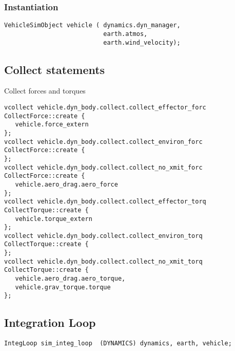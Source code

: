 \documentclass[twoside,11pt,titlepage]{report}
\begin{document}
\subsubsection{Instantiation}
\begin{verbatim}
VehicleSimObject vehicle ( dynamics.dyn_manager,
                           earth.atmos,
                           earth.wind_velocity);
\end{verbatim}

\subsection{Collect statements}
Collect forces and torques
\begin{verbatim}
vcollect vehicle.dyn_body.collect.collect_effector_forc CollectForce::create {
   vehicle.force_extern
};
vcollect vehicle.dyn_body.collect.collect_environ_forc CollectForce::create {
};
vcollect vehicle.dyn_body.collect.collect_no_xmit_forc CollectForce::create {
   vehicle.aero_drag.aero_force
};
vcollect vehicle.dyn_body.collect.collect_effector_torq CollectTorque::create {
   vehicle.torque_extern
};
vcollect vehicle.dyn_body.collect.collect_environ_torq CollectTorque::create {
};
vcollect vehicle.dyn_body.collect.collect_no_xmit_torq CollectTorque::create {
   vehicle.aero_drag.aero_torque,
   vehicle.grav_torque.torque
};
\end{verbatim}

\subsection{Integration Loop}
\begin{verbatim}
IntegLoop sim_integ_loop  (DYNAMICS) dynamics, earth, vehicle;
\end{verbatim}

\newpage
{}



\end{document}

